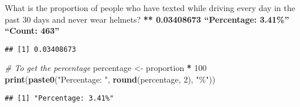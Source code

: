 \documentclass[
]{article}
\newenvironment{Shaded}{\begin{snugshade}}{\end{snugshade}}
\newcommand{\AttributeTok}[1]{\textcolor[rgb]{0.13,0.29,0.53}{#1}}
\newcommand{\CommentTok}[1]{\textcolor[rgb]{0.56,0.35,0.01}{\textit{#1}}}
\newcommand{\ConstantTok}[1]{\textcolor[rgb]{0.56,0.35,0.01}{#1}}
\newcommand{\DecValTok}[1]{\textcolor[rgb]{0.00,0.00,0.81}{#1}}
\newcommand{\FunctionTok}[1]{\textcolor[rgb]{0.13,0.29,0.53}{\textbf{#1}}}
\newcommand{\NormalTok}[1]{#1}
\newcommand{\OtherTok}[1]{\textcolor[rgb]{0.56,0.35,0.01}{#1}}
\newcommand{\SpecialCharTok}[1]{\textcolor[rgb]{0.81,0.36,0.00}{\textbf{#1}}}
\newcommand{\StringTok}[1]{\textcolor[rgb]{0.31,0.60,0.02}{#1}}
\begin{document}
What is the proportion of people who have texted while driving every day
in the past 30 days and never wear helmets? \textbf{** 0.03408673
``Percentage: 3.41\%'' ``Count: 463''}

\begin{Shaded}
\end{Shaded}

\begin{verbatim}
## [1] 0.03408673
\end{verbatim}

\begin{Shaded}
\begin{Highlighting}[]
\CommentTok{\# To get the percentage}
\NormalTok{percentage }\OtherTok{\textless{}{-}}\NormalTok{ proportion }\SpecialCharTok{*} \DecValTok{100}
\FunctionTok{print}\NormalTok{(}\FunctionTok{paste0}\NormalTok{(}\StringTok{"Percentage: "}\NormalTok{, }\FunctionTok{round}\NormalTok{(percentage, }\DecValTok{2}\NormalTok{), }\StringTok{"\%"}\NormalTok{))}
\end{Highlighting}
\end{Shaded}

\begin{verbatim}
## [1] "Percentage: 3.41%"
\end{verbatim}

\begin{Shaded}
\end{Shaded}
\end{document}
